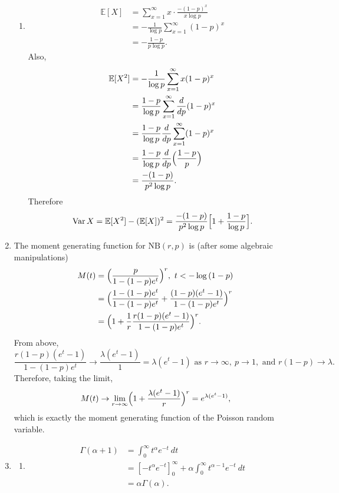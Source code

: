 \documentclass{article}
\DeclareMathOperator{\var}{Var}
\begin{document}
\begin{enumerate}
\begin{enumerate}
        \item \begin{align*}
            \mathbb{E}[X]
            &= \sum_{x = 1}^{\infty} x \cdot \frac{-(1 - p)^{x}}{x\log{p}} \\
            &= -\frac{1}{\log{p}} \sum_{x = 1}^{\infty} (1 - p)^{x} \\
            &= -\frac{1 - p}{p\log{p}}.
        \end{align*}
        Also, \begin{align*}
            \mathbb{E}[X^2]
            &= -\frac{1}{\log{p}} \sum_{x = 1}^{\infty} x(1 - p)^{x} \\
            &= \frac{1 - p}{\log{p}} \sum_{x = 1}^{\infty} \frac{d}{dp} (1 - p)^{x} \\
            &= \frac{1 - p}{\log{p}} \frac{d}{dp} \sum_{x = 1}^{\infty} (1 - p)^{x} \\
            &= \frac{1 - p}{\log{p}} \frac{d}{dp} \Bigl( \frac{1 - p}{p} \Bigr) \\
            &= \frac{-(1 - p)}{p^{2}\log{p}}.
        \end{align*}
        Therefore 
        \[ \var{X} = \mathbb{E}[X^2] - (\mathbb{E}[X])^2 = \frac{-(1 - p)}{p^{2}\log{p}} 
        \Bigl[ 1 + \frac{1 - p}{\log{p}} \Bigr]. \]
    \end{enumerate}

    \item The moment generating function for $\text{NB}(r, p)$ is (after some algebraic manipulations)
    \begin{align*}
        M(t) 
        &= \Bigl( \frac{p}{1 - (1 - p)e^{t}} \Bigr)^{r}, \ t < -\log{(1 - p)} \\
        &= \Bigl( \frac{1 - (1 - p)e^{t}}{1 - (1 - p)e^{t}} 
        + \frac{(1 - p)(e^{t} - 1)}{1 - (1 - p)e^{t}} \Bigr)^{r} \\
        &= \Bigl( 1 + \frac{1}{r} \frac{r(1 - p)(e^{t} - 1)}{1 - (1 - p)e^{t}} \Bigr)^{r}.
    \end{align*}
    From above, 
    \[ \frac{r(1 - p)(e^{t} - 1)}{1 - (1 - p)e^{t}} \to \frac{\lambda (e^{t} - 1)}{1} 
    = \lambda (e^{t} - 1) \text{ as } r \to \infty, \ p \to 1, \text{ and } r(1 - p) \to \lambda. \]
    Therefore, taking the limit, 
    \[ M(t) \to \lim_{r \to \infty} \Bigl( 1 + \frac{\lambda (e^{t} - 1)}{r} \Bigr)^{r} 
    = e^{\lambda(e^{t} - 1)}, \]
    which is exactly the moment generating function of the Poisson random variable.

    \item \begin{enumerate}
        \item \begin{align*}
            \Gamma(\alpha + 1)
            &= \int_{0}^{\infty} t^{\alpha} e^{-t} \ dt \\
            &= [-t^{\alpha} e^{-t}]_{0}^{\infty} + \alpha \int_{0}^{\infty} t^{\alpha - 1} e^{-t} \ dt \\
            &= \alpha \Gamma(\alpha).
        \end{align*}


\end{enumerate}
\end{enumerate}
\end{document}
